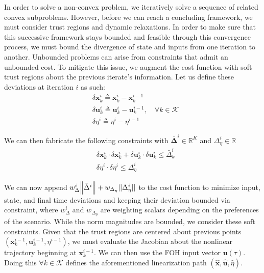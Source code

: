 In order to solve a non-convex problem, we iteratively solve a sequence of related convex subproblems. However, before we can reach a concluding framework, we must consider trust regions and dynamic relaxations. In order to make sure that this successive framework stays bounded and feasible through this convergence process, we must bound the divergence of state and inputs from one iteration to another. Unbounded problems can arise from constraints that admit an unbounded cost. To mitigate this issue, we augment the cost function with soft trust regions about the previous iterate's information. Let us define these deviations at iteration $i$ as such:
\begin{align}
& \delta \mathbf{x}_k^i \triangleq \mathbf{x}_k^i - \mathbf{x}_k^{i-1} \\
& \delta \mathbf{u}_k^i \triangleq \mathbf{u}_k^i - \mathbf{u}_k^{i-1}, \quad \forall k \in \mathcal{K}\\
& \delta \eta^i \triangleq \eta^i - \eta^{i-1}
\end{align}

We can then fabricate the following constraints with $\bm{\bar{\Delta}}^i \in \mathbb{R}^K$ and $\Delta_\eta^i \in \mathbb{R}$
\begin{align}
& \delta \mathbf{x}_k^i \cdot \delta \mathbf{x}_k^i + \delta \mathbf{u}_k^i \cdot \delta \mathbf{u}_k^i \leq \bar{\Delta}_k^i \\
& \delta \eta^i \cdot \delta \eta^i \leq \Delta_\eta^i
\end{align}

We can now append $w_\Delta^i \norm{{\bar{\Delta}}^i} + w_{\Delta_\eta} ||\Delta_\eta^i ||$ to the cost function to minimize input, state, and final time deviations and keeping their deviation bounded via constraint, where $w_\Delta^i$ and $w_{\Delta_\eta}$ are weighting scalars depending on the preferences of the scenario. While the norm magnitudes are bounded, we consider these soft constraints.
Given that the trust regions are centered about previous points $(\mathbf{x}_{k}^{i-1},\mathbf{u}_{k}^{i-1},\eta^{i-1})$, we must evaluate the Jacobian about the nonlinear trajectory beginning at $\mathbf{x}_{k}^{i-1}$. We can then use the FOH input vector $\mathbf{u}(\tau)$. Doing this $\forall k \in \mathcal{K}$ defines the aforementioned linearization path $(\hat{\mathbf{x}}, \hat{\mathbf{u}}, \hat{\eta})$. 


